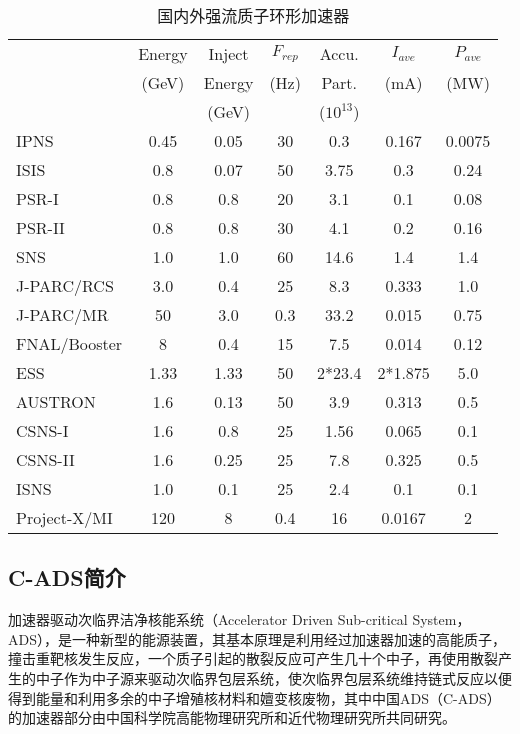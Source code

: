 \begin{table}[!htb]
  \centering
  \begin{tabular}{|>{\small}l|c|c|c|c|c|c|}
    \hline
                &Energy &Inject  &$F_{rep}$ &Accu.    &$I_{ave}$ &$P_{ave}$ \\
                &(GeV)  &Energy  &(Hz)      &Part.    &(mA)      &(MW)      \\
                &       &(GeV)   &          &($10^{13}$) &       &          \\
    \hline
    IPNS        &0.45   &0.05    &30        &0.3      &0.167     &0.0075    \\
    ISIS        &0.8    &0.07    &50        &3.75     &0.3       &0.24      \\
    PSR-I       &0.8    &0.8     &20        &3.1      &0.1       &0.08      \\
    PSR-II      &0.8    &0.8     &30        &4.1      &0.2       &0.16      \\
    SNS         &1.0    &1.0     &60        &14.6     &1.4       &1.4       \\
    J-PARC/RCS  &3.0    &0.4     &25        &8.3      &0.333     &1.0       \\
    J-PARC/MR   &50     &3.0     &0.3       &33.2     &0.015     &0.75      \\
    FNAL/Booster&8      &0.4     &15        &7.5      &0.014     &0.12      \\
    ESS         &1.33   &1.33    &50        &2*23.4   &2*1.875   &5.0       \\
    AUSTRON     &1.6    &0.13    &50        &3.9      &0.313     &0.5       \\
    CSNS-I      &1.6    &0.8     &25        &1.56     &0.065     &0.1       \\
    CSNS-II     &1.6    &0.25    &25        &7.8      &0.325     &0.5       \\
    ISNS        &1.0    &0.1     &25        &2.4      &0.1       &0.1       \\
    Project-X/MI&120    &8       &0.4       &16       &0.0167    &2         \\
    \hline
  \end{tabular}
  \caption{国内外强流质子环形加速器}
  \label{tab:proton_ring}
\end{table}


\subsection{C-ADS简介}
加速器驱动次临界洁净核能系统（Accelerator Driven Sub-critical System，ADS），是一种新型的能源装置，其基本原理是利用经过加速器加速的高能质子，撞击重靶核发生反应，一个质子引起的散裂反应可产生几十个中子，再使用散裂产生的中子作为中子源来驱动次临界包层系统，使次临界包层系统维持链式反应以便得到能量和利用多余的中子增殖核材料和嬗变核废物，其中中国ADS（C-ADS）的加速器部分由中国科学院高能物理研究所和近代物理研究所共同研究。

